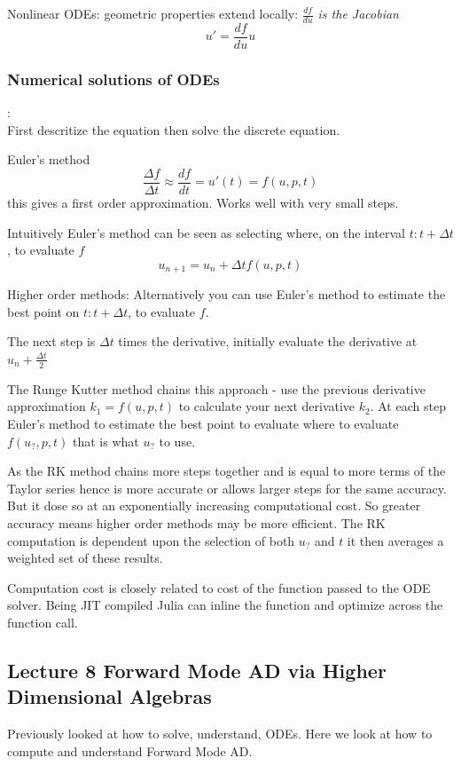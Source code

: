 Nonlinear ODEs: geometric properties extend locally: \emph{$\frac{df}{du}$ is the Jacobian}
\[u'= \frac{df}{du} u\]

\subsubsection*{Numerical solutions of ODEs}:\\
First descritize the equation then solve the discrete equation.

Euler's method
\[\frac{\Delta f}{\Delta t} \approx \frac{df}{dt} = u'(t) = f(u,p,t)\]
this gives a first order approximation. Works well with very small steps.

 Intuitively Euler's method can be seen as selecting  where, on the interval $t:t+\Delta t$, to evaluate $f$ 
\[u_{n+1} = u_n +\Delta t f(u,p,t)\]

Higher order methods: Alternatively you can use Euler's method to estimate the best point on $t:t+\Delta t$, to evaluate $f$. 

The next step is $\Delta t$ times the derivative, initially evaluate the derivative at $u_n+ \frac{\Delta t}{2}$

The Runge Kutter method chains this approach  - use the previous derivative approximation $k_1=f(u,p,t)$ to calculate your next derivative $k_2$. At each step  Euler's method to estimate the best point to evaluate where to evaluate $f(u_?,p,t)$ that is what $u_?$ to use. 

As the RK method chains more steps together and is  equal to more terms of the Taylor series hence is more accurate or allows larger steps for the same accuracy.  But it dose  so at an exponentially increasing computational cost. So greater accuracy means higher order methods may be more efficient. The RK computation is dependent upon the selection of both $u_?$ and $t$ it then averages a weighted set of these results.

Computation cost is closely related to cost of the function passed to the ODE solver. Being JIT compiled Julia can inline the function and optimize across the function call.

\subsection{Lecture 8 Forward Mode AD via Higher Dimensional Algebras} 
Previously looked at how to solve, understand, ODEs. Here we look at how to compute and understand Forward Mode AD.

